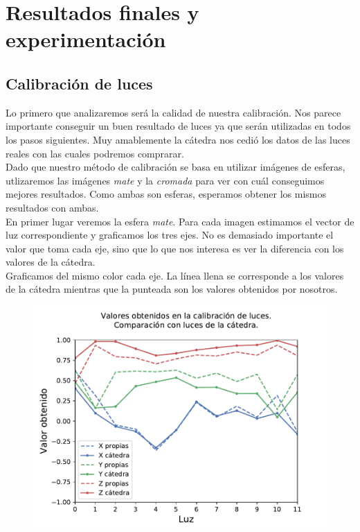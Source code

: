 \section{Resultados finales y experimentación}


\subsection{Calibración de luces}

Lo primero que analizaremos será la calidad de nuestra calibración. Nos parece importante conseguir un buen resultado de luces ya que serán utilizadas en todos los pasos siguientes. Muy amablemente la cátedra nos cedió los datos de las luces reales con las cuales podremos comprarar. \\

Dado que nuestro método de calibración se basa en utilizar imágenes de esferas, utlizaremos las imágenes \textit{mate} y la \textit{cromada} para ver con cuál conseguimos mejores resultados. Como ambas son esferas, esperamos obtener los mismos resultados con ambas. \\

En primer lugar veremos la esfera \textit{mate}. Para cada imagen estimamos el vector de luz correspondiente y graficamos los tres ejes. No es demasiado importante el valor que toma cada eje, sino que lo que nos interesa es ver la diferencia con los valores de la cátedra. \\

Graficamos del mismo color cada eje. La línea llena se corresponde a los valores de la cátedra mientras que la punteada son los valores obtenidos por nosotros. \\

{\centering
\begin{figure}[H]
\centering
    \includegraphics[scale=0.80]{informe/imagenes/lucesComparacionFinalMate.pdf}
    \end{figure}
}

